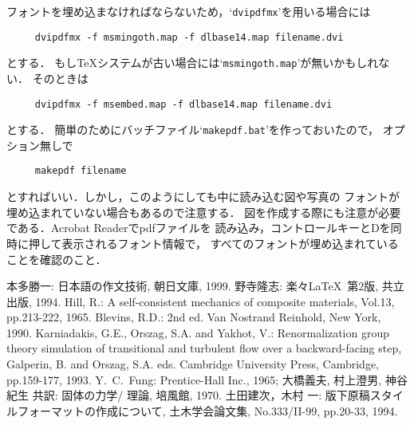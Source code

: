 \documentclass[dvipdfmx,onecolumn]{jsce}  %
\begin{document}
フォントを埋め込まなければならないため，`{\tt dvipdfmx}'を用いる場合には
\begin{verbatim}
     dvipdfmx -f msmingoth.map -f dlbase14.map filename.dvi
\end{verbatim}
とする．
もし\TeX システムが古い場合には`{\tt msmingoth.map}'が無いかもしれない．
そのときは
\begin{verbatim}
     dvipdfmx -f msembed.map -f dlbase14.map filename.dvi
\end{verbatim}
とする．
簡単のためにバッチファイル`{\tt makepdf.bat}'を作っておいたので，
オプション無しで
\begin{verbatim}
     makepdf filename
\end{verbatim}
とすればいい．しかし，このようにしても中に読み込む図や写真の
フォントが埋め込まれていない場合もあるので注意する．
図を作成する際にも注意が必要である．Acrobat Readerでpdfファイルを
読み込み，コントロールキーとDを同時に押して表示されるフォント情報で，
すべてのフォントが埋め込まれていることを確認のこと．



\begin{thebibliography}{1}
 本多勝一:
 \newblock 日本語の作文技術,
 \newblock 朝日文庫, 1999.
 野寺隆志:
 \newblock 楽々\LaTeX\ 第2版,
 \newblock 共立出版, 1994.
 Hill, R.: A self-consistent mechanics of composite materials,
  Vol.13, pp.213-222, 1965.
 Blevins, R.D.:
  2nd ed.
 Van Nostrand Reinhold, New York, 1990.
 Karniadakis, G.E., Orszag, S.A. and Yakhot, V.:
 Renormalization group theory simulation of
 transitional and turbulent flow over a backward-facing step,
  Galperin, B. and Orszag, S.A. eds.
 Cambridge University Press, Cambridge, pp.159-177, 1993.
 Y.~C.~Fung:
 \newblock Prentice-Hall Inc., 1965;
 \newblock 大橋義夫, 村上澄男, 神谷紀生 共訳:
 \newblock 固体の力学/ 理論, 
 \newblock 培風館, 1970.
 土田建次，木村 一:
 \newblock 版下原稿スタイルフォーマットの作成について,
 \newblock 土木学会論文集, No.333/II-99, pp.20-33, 1994.
\end{thebibliography}

\lastpagesettings
\end{document}
